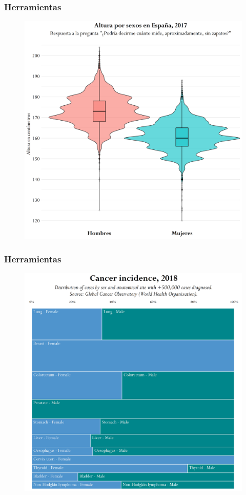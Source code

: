 \documentclass{beamer}
\begin{document}

\begin{frame}\frametitle{Herramientas}
	\vspace{-5pt}
	\begin{figure}
		\centering
		\includegraphics[width=.68\textwidth]{images/25.png}
	\end{figure}
\end{frame}


\begin{frame}\frametitle{Herramientas}
	\vspace{-5pt}
	\begin{figure}
		\centering
		\includegraphics[width=.68\textwidth]{images/26.png}
	\end{figure}	
\end{frame}
\end{document}
